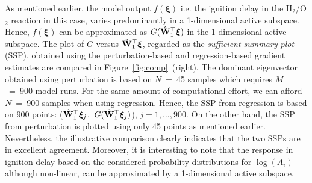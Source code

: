 As mentioned earlier, the model output $f(\bm{\xi})$ i.e. the ignition delay in the
H$_2$/O$_2$ reaction in this case, varies
 predominantly in a 1-dimensional active subspace. Hence, 
$f(\bm{\xi})$ can be approximated as $G(\hat{\mathbf{{W}}}_1^\top\bm{\xi})$ in
the 1-dimensional active subspace. The plot of $G$ versus $\hat{\mathbf{{W}}}_1^\top\bm{\xi}$, 
regarded as the \textit{sufficient summary plot} (SSP), obtained using the perturbation-based and
regression-based gradient estimates are
compared in Figure~\ref{fig:comp}~(right).
%
%
The dominant eigenvector obtained using perturbation is based on
$N$~=~45 samples which requires $M$~=~900 model runs. For the same amount of
computational effort, we can afford $N$~=~900 samples when using regression.
Hence, the SSP from regression is based on 900 points:
($\hat{\mathbf{{W}}}_1^\top\bm{\xi}_j$,~$G(\hat{\mathbf{{W}}}_1^\top\bm{\xi}_j)$),
$j = 1, \ldots, 900$. On the
other hand, the SSP from perturbation is plotted using only 45 points as
mentioned earlier.  Nevertheless, the illustrative comparison clearly indicates
that the two SSPs are in excellent agreement. Moreover, it is interesting to
note that the response in ignition delay based on the considered probability
distributions for $\log(A_i)$ although non-linear, can be approximated by a
1-dimensional active subspace.

